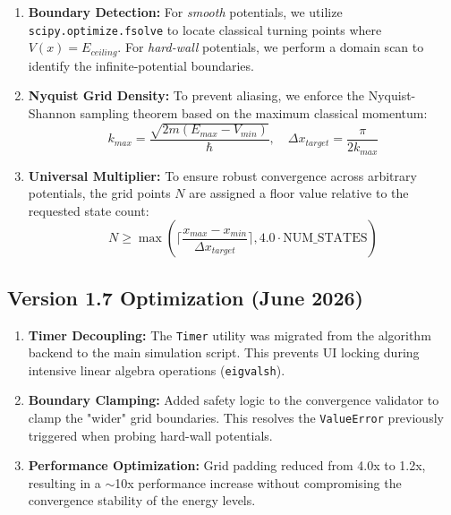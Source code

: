 \documentclass{article}
\numberwithin{equation}{subsection}
\begin{document}
\begin{enumerate}[label=\textbf{\arabic*.}]
    \item \textbf{Boundary Detection:} For \textit{smooth} potentials, we utilize \texttt{scipy.optimize.fsolve} to locate classical turning points where $V(x) = E_{ceiling}$. For \textit{hard-wall} potentials, we perform a domain scan to identify the infinite-potential boundaries.
    \item \textbf{Nyquist Grid Density:} To prevent aliasing, we enforce the Nyquist-Shannon sampling theorem based on the maximum classical momentum:
    \begin{equation}
        k_{max} = \frac{\sqrt{2m(E_{max} - V_{min})}}{\hbar}, \quad \Delta x_{target} = \frac{\pi}{2 k_{max}}
    \end{equation}
    \item \textbf{Universal Multiplier:} To ensure robust convergence across arbitrary potentials, the grid points $N$ are assigned a floor value relative to the requested state count:
    \begin{equation}
        N \geq \max\left( \lceil \frac{x_{max} - x_{min}}{\Delta x_{target}} \rceil, 4.0 \cdot \text{NUM\_STATES} \right)
    \end{equation}
\end{enumerate}

\subsection*{Version 1.7 Optimization (June 2026)}
\begin{enumerate}[label=\textbf{\arabic*.}]
    \item \textbf{Timer Decoupling:} The \texttt{Timer} utility was migrated from the algorithm backend to the main simulation script. This prevents UI locking during intensive linear algebra operations (\texttt{eigvalsh}).
    \item \textbf{Boundary Clamping:} Added safety logic to the convergence validator to clamp the "wider" grid boundaries. This resolves the \texttt{ValueError} previously triggered when probing hard-wall potentials.
    \item \textbf{Performance Optimization:} Grid padding reduced from 4.0x to 1.2x, resulting in a $\sim$10x performance increase without compromising the convergence stability of the energy levels.
\end{enumerate}
\end{document}
